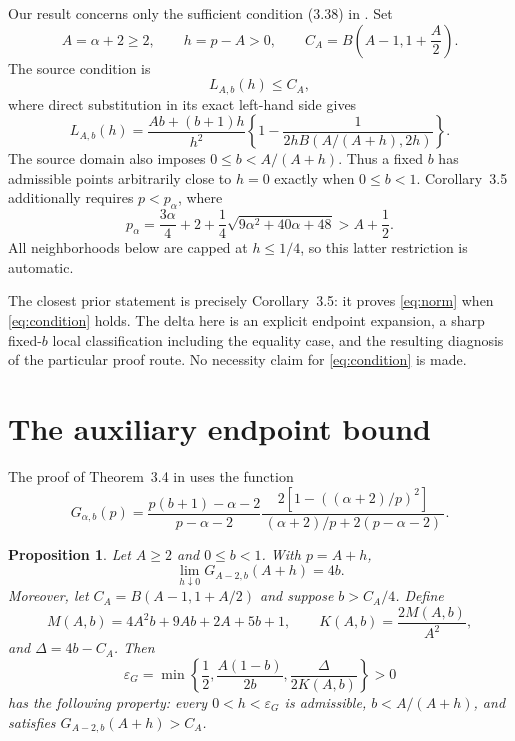\documentclass[11pt]{article}
\newtheorem{proposition}[theorem]{Proposition}
\theoremstyle{remark}
\newcommand{\eps}{\varepsilon}
\begin{document}
Our result concerns only the sufficient condition (3.38) in
\cite[Corollary~3.5]{li2026norm}.  Set
\[
 A=\alpha+2\geq2,\qquad h=p-A>0,
 \qquad C_A=B\left(A-1,1+\frac A2\right).
\]
The source condition is
\begin{equation}
 L_{A,b}(h)\leq C_A,                                      \label{eq:condition}
\end{equation}
where direct substitution in its exact left-hand side gives
\begin{equation}
 L_{A,b}(h)=\frac{Ab+(b+1)h}{h^2}
 \left\{1-\frac{1}{2hB(A/(A+h),2h)}\right\}.             \label{eq:L}
\end{equation}
The source domain also imposes $0\leq b<A/(A+h)$.  Thus a fixed $b$ has
admissible points arbitrarily close to $h=0$ exactly when $0\leq b<1$.
Corollary~3.5 additionally requires $p<p_\alpha$, where
\[
 p_\alpha=\frac{3\alpha}{4}+2+
 \frac14\sqrt{9\alpha^2+40\alpha+48}>A+\frac12.
\]
All neighborhoods below are capped at $h\leq1/4$, so this latter restriction
is automatic.

The closest prior statement is precisely Corollary~3.5: it proves
\eqref{eq:norm} when \eqref{eq:condition} holds.  The delta here is an
explicit endpoint expansion, a sharp fixed-$b$ local classification
including the equality case, and the resulting diagnosis of the particular
proof route.  No necessity claim for \eqref{eq:condition} is made.

\section{The auxiliary endpoint bound}

The proof of Theorem~3.4 in \cite{li2026norm} uses the function
\begin{equation}
 G_{\alpha,b}(p)=
 \frac{p(b+1)-\alpha-2}{p-\alpha-2}
 \frac{2\left[1-\left((\alpha+2)/p\right)^2\right]}
 {\, (\alpha+2)/p+2(p-\alpha-2)\,}.                     \label{eq:Gsource}
\end{equation}

\begin{proposition}\label{prop:G}
Let $A\geq2$ and $0\leq b<1$.  With $p=A+h$,
\[
 \lim_{h\downarrow0}G_{A-2,b}(A+h)=4b.
\]
Moreover, let $C_A=B(A-1,1+A/2)$ and suppose $b>C_A/4$.  Define
\[
 M(A,b)=4A^2b+9Ab+2A+5b+1,
 \qquad K(A,b)=\frac{2M(A,b)}{A^2},
\]
and $\Delta=4b-C_A$.  Then
\begin{equation}
 \eps_G=\min\left\{\frac12,\frac{A(1-b)}{2b},
                  \frac{\Delta}{2K(A,b)}\right\}>0      \label{eq:epsG}
\end{equation}
has the following property: every $0<h<\eps_G$ is admissible,
$b<A/(A+h)$, and satisfies
$G_{A-2,b}(A+h)>C_A$.
\end{proposition}
\end{document}
